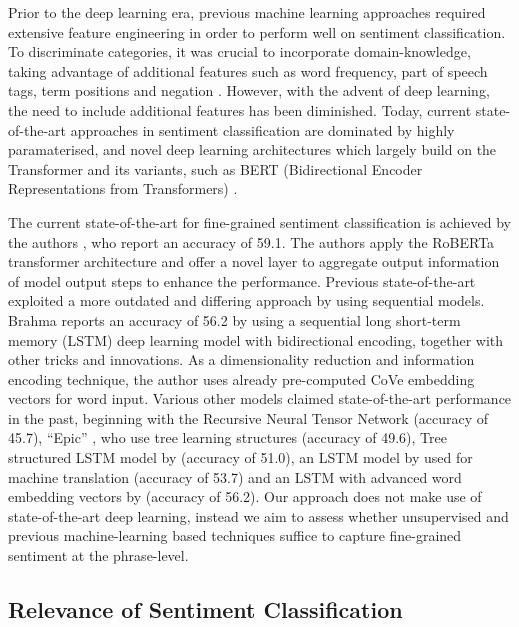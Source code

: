 \documentclass{article}
\begin{document}
Prior to the deep learning era, previous machine learning approaches required extensive feature engineering in order to perform well on sentiment classification. To discriminate categories, it was crucial to incorporate domain-knowledge, taking advantage of additional features such as word frequency, part of speech tags, term positions and negation \cite{DBLP:journals/corr/KhardeS16}. However, with the advent of deep learning, the need to include additional features has been diminished. Today, current state-of-the-art approaches in sentiment classification are dominated by highly paramaterised, and novel deep learning architectures which largely build on the Transformer \cite{DBLP:journals/corr/VaswaniSPUJGKP17} and its variants, such as BERT (Bidirectional Encoder Representations from Transformers) \cite{DBLP:journals/corr/abs-1810-04805}. 

The current state-of-the-art for fine-grained sentiment classification is achieved by the authors \cite{sun2020self}, who report an accuracy of 59.1. The authors apply the RoBERTa transformer architecture and offer a novel layer to aggregate output information of model output steps to enhance the performance. Previous state-of-the-art exploited a more outdated and differing approach by using sequential models. Brahma \cite{brahma2018improved} reports an accuracy of 56.2 by using a sequential long short-term memory (LSTM) deep learning model with bidirectional encoding, together with other tricks and innovations. As a dimensionality reduction and information encoding technique, the author uses already pre-computed CoVe \cite{mccann2017learned} embedding vectors for word input. Various other models claimed state-of-the-art performance in the past, beginning with the Recursive Neural Tensor Network \cite{socher-etal-2013-recursive} (accuracy of 45.7), “Epic” \cite{hall2014less}, who use tree learning structures (accuracy of 49.6), Tree structured LSTM model by \cite{tai2015improved} (accuracy of 51.0), an LSTM model by \cite{mccann2017learned} used for machine translation (accuracy of 53.7) and an LSTM with advanced word embedding vectors by \cite{peters2018deep} (accuracy of 56.2). Our approach does not make use of state-of-the-art deep learning, instead we aim to assess whether unsupervised and previous machine-learning based techniques suffice to capture fine-grained sentiment at the phrase-level.  

\subsection{Relevance of Sentiment Classification}
\end{document}
